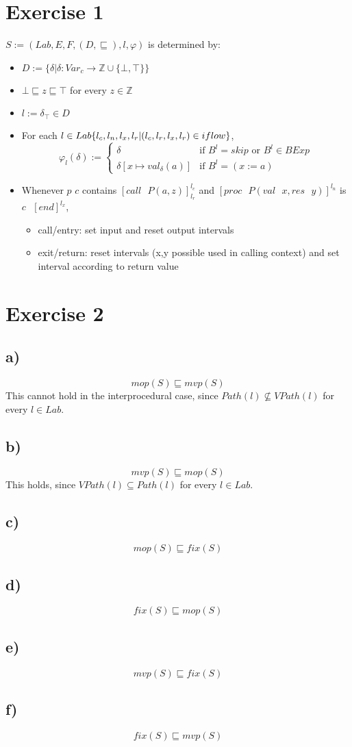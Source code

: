 \documentclass[fleqn,12pt]{article}
\begin{document}
\section*{Exercise 1}
$S:=(Lab,E,F,(D,\sqsubseteq),l,\varphi)$ is determined by:
\begin{itemize}
\item $D:=\{\delta | \delta: Var_c \rightarrow \mathbb{Z} \cup \{\bot, \top\}\}$
\item $\bot \sqsubseteq z \sqsubseteq \top$ for every $z \in \mathbb{Z}$
\item $l:= \delta_{\top} \in D$
\item For each $l \in Lab \\ \{l_c,l_n,l_x,l_r | (l_c,l_r,l_x,l_r) \in iflow\}$,
\[
 \varphi_l(\delta) := 
  \begin{cases} 
   \delta & \text{if } B^{l} = skip \text{ or } B^{l} \in BExp \\
   \delta [x \mapsto val_{\delta}(a)]       & \text{if } B^l = (x:=a)
  \end{cases}
\]
\item Whenever $p$ $c$ contains $[call \text{ } P(a,z)]^{l_c}_{l_r}$ and $[proc \text{ } P(val \text{ } x,res \text{ } y)]^{l_n}$ is $c \text{ } [end]^{l_x}$,
\begin{itemize}
\item call/entry: set input and reset output intervals
\item exit/return: reset intervals (x,y possible used in calling context) and set interval according to return value
\end{itemize}
\end{itemize}
\section*{Exercise 2}
\subsection*{a)}
$$mop(S) \sqsubseteq mvp(S)$$
This cannot hold in the interprocedural case, since $Path(l) \nsubseteq VPath(l)$ for every $l \in Lab$.
\subsection*{b)}
$$mvp(S) \sqsubseteq mop(S)$$
This holds, since $VPath(l) \subseteq Path(l)$ for every $l \in Lab$.
\subsection*{c)}
$$mop(S) \sqsubseteq fix(S)$$
\subsection*{d)}
$$fix(S) \sqsubseteq mop(S)$$
\subsection*{e)}
$$mvp(S) \sqsubseteq fix(S)$$
\subsection*{f)}
$$fix(S) \sqsubseteq mvp(S)$$
\end{document}
